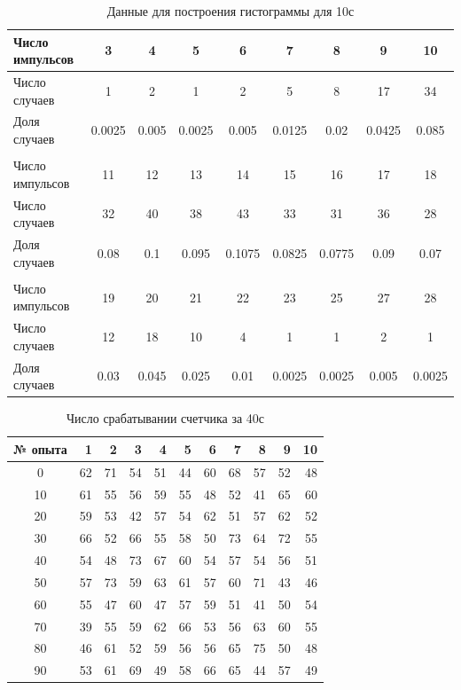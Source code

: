 \documentclass[a4paper, 12pt]{article}
\begin{document}
    \begin{table}[H]
    \begin{center}
    \begin{tabular}{|l|c|c|c|c|c|c|c|c|}\hline
    Число импульсов & 3 & 4 & 5 & 6 & 7 & 8 & 9 & 10 \\\hline
    Число случаев & 1 & 2 & 1 & 2 & 5 & 8 & 17 & 34 \\\hline
    Доля случаев & 0.0025 & 0.005 & 0.0025 & 0.005 & 0.0125 & 0.02 & 0.0425 & 0.085 \\\hline
    \multicolumn{9}{c}{}\\\hline
    Число импульсов & 11 & 12 & 13 & 14 & 15 & 16 & 17 & 18 \\\hline
    Число случаев & 32 & 40 & 38 & 43 & 33 & 31 & 36 & 28 \\\hline
    Доля случаев & 0.08 & 0.1 & 0.095 & 0.1075 & 0.0825 & 0.0775 & 0.09 & 0.07 \\\hline
    \multicolumn{9}{c}{}\\\hline
    Число импульсов & 19 & 20 & 21 & 22 & 23 & 25 & 27 & 28 \\\hline
    Число случаев & 12 & 18 & 10 & 4 & 1 & 1 & 2 & 1 \\\hline
    Доля случаев & 0.03 & 0.045 & 0.025 & 0.01 & 0.0025 & 0.0025 & 0.005 & 0.0025 \\\hline
    \end{tabular}
    \caption{Данные для построения гистограммы для 10с}
    \end{center}
    \end{table}
    \newpage

    \begin{table}[H]
    \begin{center}
    \begin{tabular}{|c|r|r|r|r|r|r|r|r|r|r|}
    \hline
    {№ опыта} &   1 &   2 &   3 &   4 &   5 &   6 &   7 &   8 &   9 &  10 \\
    \hline
    0 &  62 &  71 &  54 &  51 &  44 &  60 &  68 &  57 &  52 &  48 \\
    10 &  61 &  55 &  56 &  59 &  55 &  48 &  52 &  41 &  65 &  60 \\
    20 &  59 &  53 &  42 &  57 &  54 &  62 &  51 &  57 &  62 &  52 \\
    30 &  66 &  52 &  66 &  55 &  58 &  50 &  73 &  64 &  72 &  55 \\
    40 &  54 &  48 &  73 &  67 &  60 &  54 &  57 &  54 &  56 &  51 \\
    50 &  57 &  73 &  59 &  63 &  61 &  57 &  60 &  71 &  43 &  46 \\
    60 &  55 &  47 &  60 &  47 &  57 &  59 &  51 &  41 &  50 &  54 \\
    70 &  39 &  55 &  59 &  62 &  66 &  53 &  56 &  63 &  60 &  55 \\
    80 &  46 &  61 &  52 &  59 &  56 &  56 &  65 &  75 &  50 &  48 \\
    90 &  53 &  61 &  69 &  49 &  58 &  66 &  65 &  44 &  57 &  49 \\
    \hline
    \end{tabular}
    \caption{Число срабатывании счетчика за 40с}
    \end{center}
    \end{table}
\end{document}
